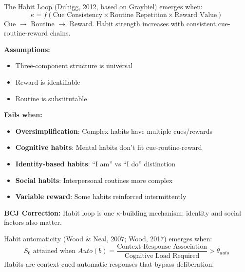 \begin{theorem}
\label{thm:habit-loop}
The Habit Loop (Duhigg, 2012, based on Graybiel) emerges when:
\begin{equation}
\boxed{\kappa = f(\text{Cue Consistency} \times \text{Routine Repetition} \times \text{Reward Value})}
\end{equation}
Cue $\to$ Routine $\to$ Reward. Habit strength increases with consistent cue-routine-reward chains.
\end{theorem}

\begin{tcolorbox}[colback=red!5!white, colframe=red!75!black, title=Boundary Condition: Where Habit Loop Fails]
\textbf{Assumptions:}
\begin{itemize}[nosep]
\item Three-component structure is universal
\item Reward is identifiable
\item Routine is substitutable
\end{itemize}

\textbf{Fails when:}
\begin{itemize}[nosep]
\item \textbf{Oversimplification}: Complex habits have multiple cues/rewards
\item \textbf{Cognitive habits}: Mental habits don't fit cue-routine-reward
\item \textbf{Identity-based habits}: ``I am'' vs ``I do'' distinction
\item \textbf{Social habits}: Interpersonal routines more complex
\item \textbf{Variable reward}: Some habits reinforced intermittently
\end{itemize}

\textbf{BCJ Correction:} Habit loop is one $\kappa$-building mechanism; identity and social factors also matter.
\end{tcolorbox}


\begin{theorem}
\label{thm:automaticity}
Habit automaticity (Wood \& Neal, 2007; Wood, 2017) emerges when:
\begin{equation}
\boxed{S_6 \text{ attained when } Auto(b) = \frac{\text{Context-Response Association}}{\text{Cognitive Load Required}} > \theta_{auto}}
\end{equation}
Habits are context-cued automatic responses that bypass deliberation.
\end{theorem}

